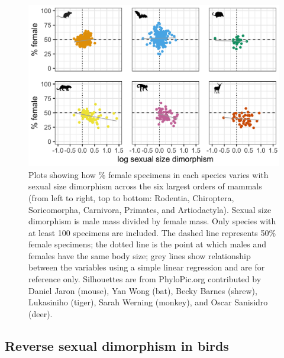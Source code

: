 \documentclass[a4paper, 12pt]{article}
\begin{document}
\begin{figure}
 \centering
  \includegraphics[width = \linewidth]{figures/ssd-orders-mammals.png}
  \caption{Plots showing how \% female specimens in each species varies with sexual size dimorphism across the six largest orders of mammals (from left to right, top to bottom: Rodentia, Chiroptera, Soricomorpha, Carnivora, Primates, and Artiodactyla). 
  Sexual size dimorphism is male mass divided by female mass. 
  Only species with at least 100 specimens are included. 
  The dashed line represents 50\% female specimens; the dotted line is the point at which males and females have the same body size; grey lines show relationship between the variables using a simple linear regression and are for reference only. 
  Silhouettes are from PhyloPic.org contributed by Daniel Jaron (mouse), Yan Wong (bat), Becky Barnes (shrew), Lukasiniho (tiger), Sarah Werning (monkey), and Oscar Sanisidro (deer).}
  \label{fig-mammal-ssd}
\end{figure}


\subsection*{Reverse sexual dimorphism in birds}
\end{document}

